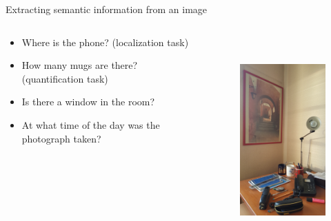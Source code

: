 \documentclass[xcolor=pdftex,dvipsnames,table,mathserif]{beamer}
\begin{document}
\begin{frame}{Extracting semantic information from an image}

\begin{columns}
  \begin{column}{.5\textwidth}
\begin{itemize}
\item Where is the phone? (localization task)
\item How many mugs are there? (quantification task)
\item Is there a window in the room?
\item At what time of the day was the photograph taken?
\end{itemize}
  \end{column}

  \begin{column}{.5\textwidth}
    \begin{figure}[ht]
      \centering
      \includegraphics[height=8cm]{bureau-1}
    \end{figure}

  \end{column}
\end{columns}

\end{frame}
\end{document}
